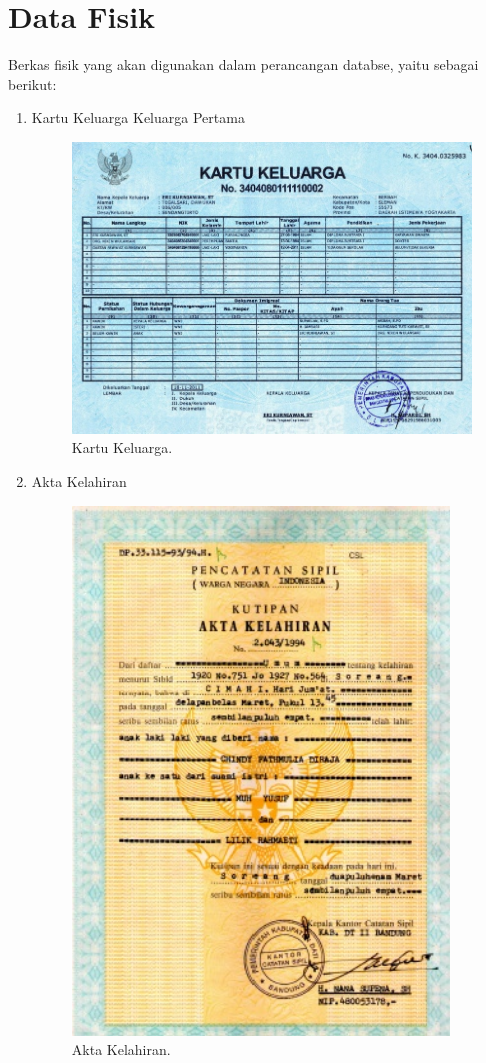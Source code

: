 \section{Data Fisik}
Berkas fisik yang akan digunakan dalam perancangan databse, yaitu sebagai berikut:
\begin{enumerate}

	\item Kartu Keluarga Keluarga Pertama
	\begin{figure}[H]
		\centering
		\includegraphics[width=12cm]{figures/kk.jpg}
		\caption{Kartu Keluarga.}	
	\end{figure}

	\item Akta Kelahiran
	\begin{figure}[H]
		\centering
		\includegraphics[width=10cm]{figures/akte.jpg}
		\caption{Akta Kelahiran.}	
	\end{figure}


\end{enumerate}
